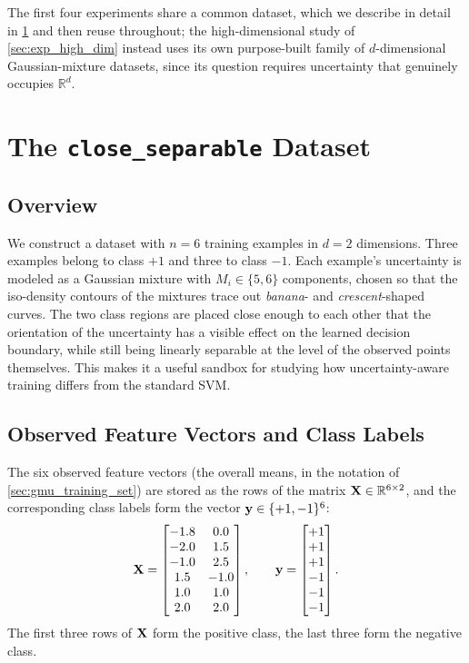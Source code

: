 \documentclass[11pt, letterpaper]{article}
\newcommand{\R}{\mathbb{R}}
\begin{document}
The first four experiments share a common dataset, which we describe in detail in \cref{sec:exp_close_separable} and then reuse throughout; the high-dimensional study of \cref{sec:exp_high_dim} instead uses its own purpose-built family of $d$-dimensional Gaussian-mixture datasets, since its question requires uncertainty that genuinely occupies $\R^d$.

\section{The \texttt{close\_separable} Dataset}\label{sec:exp_close_separable}

\subsection{Overview}

We construct a dataset with $n = 6$ training examples in $d = 2$ dimensions. Three examples belong to class $+1$ and three to class $-1$. Each example's uncertainty is modeled as a Gaussian mixture with $M_i \in \{5, 6\}$ components, chosen so that the iso-density contours of the mixtures trace out \emph{banana}- and \emph{crescent}-shaped curves. The two class regions are placed close enough to each other that the orientation of the uncertainty has a visible effect on the learned decision boundary, while still being linearly separable at the level of the observed points themselves. This makes it a useful sandbox for studying how uncertainty-aware training differs from the standard SVM.

\subsection{Observed Feature Vectors and Class Labels}

The six observed feature vectors (the overall means, in the notation of \cref{sec:gmu_training_set}) are stored as the rows of the matrix $\vb{X} \in \R^{6\times 2}$, and the corresponding class labels form the vector $\vb{y} \in \{+1,-1\}^6$:
\begin{equation}\label{eq:exp_X_y}
    \vb{X} = \begin{bmatrix}
        -1.8 &  0.0 \\
        -2.0 &  1.5 \\
        -1.0 &  2.5 \\
         1.5 & -1.0 \\
         1.0 &  1.0 \\
         2.0 &  2.0
    \end{bmatrix},
    \qquad
    \vb{y} = \begin{bmatrix} +1 \\ +1 \\ +1 \\ -1 \\ -1 \\ -1 \end{bmatrix}.
\end{equation}
The first three rows of $\vb{X}$ form the positive class, the last three form the negative class.
\end{document}
